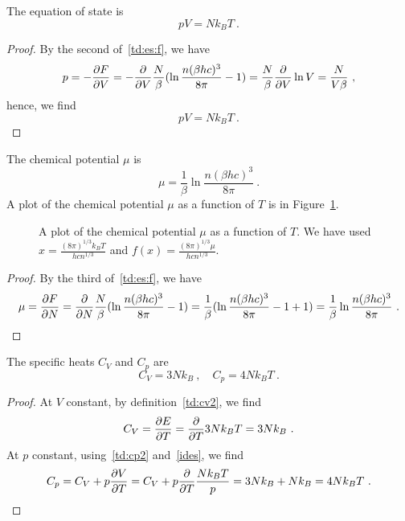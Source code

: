     The equation of state is 
    \begin{equation}\label{idesultra}
        p V = N k_B T ~.
    \end{equation}
    \begin{proof}
        By the second of~\eqref{td:es:f}, we have
        \begin{equation*}
            p = - \frac{\partial F}{\partial V} = - \frac{\partial}{\partial V} \frac{N}{\beta} (\ln \frac{n (\beta h c)^3}{8\pi} - 1) = \frac{N}{\beta} \frac{\partial}{\partial V} \ln V = \frac{N}{V \beta} ~,
        \end{equation*}
        hence, we find
        \begin{equation*}
            p V = N k_B T ~.
        \end{equation*}
    \end{proof}
    
    The chemical potential $\mu$ is 
    \begin{equation*}
        \mu = \frac{1}{\beta} \ln \frac{n (\beta h c)^3}{8\pi} ~.
    \end{equation*}
    A plot of the chemical potential $\mu$ as a function of $T$ is in Figure~\ref{fig:c:mu3}.
    \begin{figure}
        \centering
        \caption{A plot of the chemical potential $\mu$ as a function of $T$. We have used $x = \frac{(8 \pi)^{1/3} k_B T}{h c n^{1/3}}$ and $f(x) = \frac{(8 \pi)^{1/3} \mu}{h c n^{1/3}}$.}
        \label{fig:c:mu3}
    \end{figure}
    \begin{proof}
        By the third of~\eqref{td:es:f}, we have
        \begin{equation*}
            \mu = \frac{\partial F}{\partial N} = \frac{\partial}{\partial N} \frac{N}{\beta} (\ln \frac{n (\beta h c)^3}{8\pi} - 1) = \frac{1}{\beta} (\ln \frac{n (\beta h c)^3}{8\pi} - 1 + 1) = \frac{1}{\beta} \ln \frac{n (\beta h c)^3}{8\pi} ~.
        \end{equation*}
    \end{proof}

    The specific heats $C_V$ and $C_p$ are 
    \begin{equation*}
        C_V = 3 N k_B ~, \quad C_p = 4 N k_B T ~. 
    \end{equation*}
    \begin{proof}
        At $V$ constant, by definition~\eqref{td:cv2}, we find
        \begin{equation*}
            C_V = \frac{\partial E}{\partial T} = \frac{\partial}{\partial T} 3 N k_B T = 3 N k_B ~.
        \end{equation*}
        At $p$ constant, using~\eqref{td:cp2} and~\eqref{ides}, we find
        \begin{equation*}
            C_p = C_V + p \frac{\partial V}{\partial T} = C_V + p \frac{\partial}{\partial T} \frac{N k_B T}{p} = 3 N k_B + N k_B = 4 N k_B T ~.
        \end{equation*}
    \end{proof}

